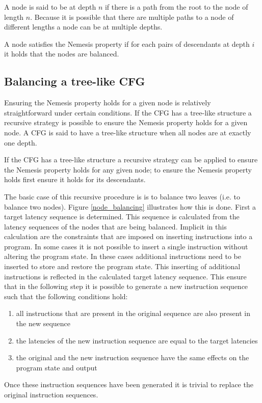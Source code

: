 \documentclass{article}
\begin{document}
A node is said to be at depth $n$ if there is a path from the root to the node of length $n$. Because it is possible that there are multiple paths to a node of different lengths a node can be at multiple depths. 

A node satisfies the Nemesis property if for each pairs of descendants at depth $i$ it holds that the nodes are balanced.  

\subsection{Balancing a tree-like CFG}
Ensuring the Nemesis property holds for a given node is relatively straightforward under certain conditions. If the CFG has a tree-like structure a recursive 
strategy is possible to ensure the Nemesis property holds for a given node. A CFG is said to have a tree-like structure when all nodes are at exactly one depth. 

If the CFG has a tree-like structure a recursive strategy can be applied to ensure the Nemesis property holds for any given node; to ensure the Nemesis property holds
first ensure it holds for its descendants. 

The basic case of this recursive procedure is is to balance two leaves (i.e. to balance two nodes). Figure \ref{node_balancing} illustrates how this is done.
First a target latency sequence is determined. This sequence is calculated from the latency sequences of the nodes that are being balanced. 
Implicit in this calculation are the constraints that are imposed on inserting instructions into a program. In some cases it is not possible to insert a single 
instruction without altering the program state. In these cases additional instructions need to be inserted to store and restore the program state. This inserting 
of additional instructions is reflected in the calculated target latency sequence. This ensure that in the following step it is possible to generate a new 
instruction sequence such that the following conditions hold:
\begin{enumerate}
	\itemsep0em
	\item all instructions that are present in the original sequence are also present in the new sequence 
	\item the latencies of the new instruction sequence are equal to the target latencies 
	\item the original and the new instruction sequence have the same effects on the program state and output
\end{enumerate}
Once these instruction sequences have been generated it is trivial to replace the original instruction sequences. 
\end{document}
